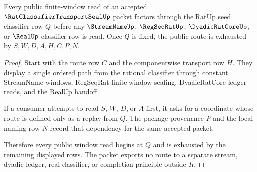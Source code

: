 \begin{theorem}
\label{thm:rat-classifier-transport-seal-window-exhaustion}
Every public finite-window read of an accepted $\RatClassifierTransportSealUp$ packet factors through the RatUp seed classifier row $Q$ before any $\StreamNameUp$, $\RegSeqRatUp$, $\DyadicRatCoreUp$, or $\RealUp$ classifier row is read. Once $Q$ is fixed, the public route is exhausted by $S,W,D,A,H,C,P,N$.
\end{theorem}
\begin{proof}
Start with the route row $C$ and the componentwise transport row $H$. They display a single ordered path from the rational classifier through constant StreamName windows, RegSeqRat finite-window sealing, DyadicRatCore ledger reads, and the RealUp handoff.

If a consumer attempts to read $S$, $W$, $D$, or $A$ first, it asks for a coordinate whose route is defined only as a replay from $Q$. The package provenance $P$ and the local naming row $N$ record that dependency for the same accepted packet.

Therefore every public window read begins at $Q$ and is exhausted by the remaining displayed rows. The packet exports no route to a separate stream, dyadic ledger, real classifier, or completion principle outside $R$.
\end{proof}

